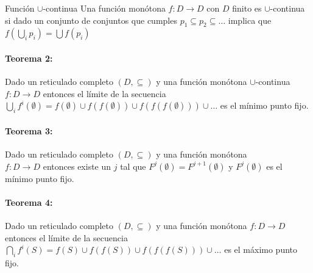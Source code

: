 \begin{definicion}{Función $\cup$-continua}
Una función monótona $f:D\to D$ con $D$ finito es $\cup$-continua si dado un conjunto de conjuntos que cumples $p_1\subseteq p_2\subseteq\dots$ implica que $f(\bigcup_i p_i) = \bigcup f(p_i)$
\end{definicion}

\paragraph{Teorema 2:} Dado un reticulado completo $(D,\subseteq)$ y una función monótona $\cup$-continua \\ $f:D\to D$ entonces el límite de la secuencia $\bigcup_i f^i(\emptyset) = f(\emptyset)\cup f(f(\emptyset)) \cup f(f(f(\emptyset)))\cup\dots$ es el mínimo punto fijo.

\paragraph{Teorema 3:} Dado un reticulado completo $(D,\subseteq)$ y una función monótona \\ $f:D\to D$ entonces existe un $j$ tal que $F^j(\emptyset) = F^{j+1}(\emptyset)$ y $F^j(\emptyset)$ es el mínimo punto fijo.

\paragraph{Teorema 4:} Dado un reticulado completo $(D,\subseteq)$ y una función monótona  $f:D\to D$ entonces el límite de la secuencia$\bigcap_i f^i(S) = f(S)\cup f(f(S)) \cup f(f(f(S)))\cup\dots$ es el máximo punto fijo.

